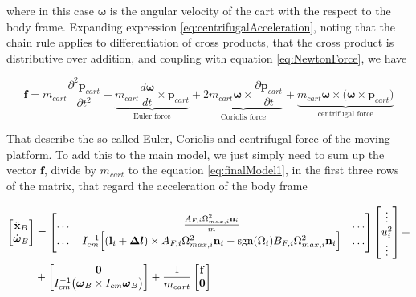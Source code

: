 \noindent where in this case $\boldsymbol{\omega}$ is the angular velocity of the cart with the respect to the body frame. Expanding expression \eqref{eq:centrifugalAcceleration}, noting that the chain rule applies to differentiation of cross products, that the cross product is distributive over addition, and coupling with equation \eqref{eq:NewtonForce}, we have

\begin{equation}
	\mathbf{f}=m_{cart}\frac{\partial^2\mathbf{p}_{cart}}{\partial t^2}+\underbrace{m_{cart}\frac{d\boldsymbol{\omega}}{dt}\times\mathbf{p}_{cart}}_{\text{Euler force}}+\underbrace{2m_{cart}\boldsymbol{\omega}\times\frac{\partial\mathbf{p}_{cart}}{\partial t}}_{\text{Coriolis force}}+\underbrace{m_{cart}\boldsymbol{\omega}\times\bigl(\boldsymbol{\omega}\times\mathbf{p}_{cart}\bigl)}_{\text{centrifugal force}}
	\label{eq:cartAllForces}
\end{equation}

\noindent That describe the so called Euler, Coriolis and centrifugal force of the moving platform. To add this to the main model, we just simply need to sum up the vector $\mathbf{f}$, divide by $m_{cart}$ to the equation \eqref{eq:finalModel1}, in the first three rows of the matrix, that regard the acceleration of the body frame

\begin{equation}
	\begin{split}
		\begin{bmatrix}
			\ddot{\mathbf{x}}_B \\
			\dot{\boldsymbol{\omega}}_B
		\end{bmatrix}
		&=
		\begin{bmatrix}
			\dots & \frac{A_{F,i}\Omega_{max,i}^2\mathbf{n}_i}{m} & \dots \\
			\dots & I_{cm}^{-1}\Big[ (\mathbf{l}_i+\boldsymbol{\Delta l})\times A_{F,i}\Omega^2_{max,i}\mathbf{n}_i-\operatorname*{sgn}(\Omega_i)B_{F,i}\Omega_{max,i}^2\mathbf{n}_i\Big] & \dots
		\end{bmatrix}
		\begin{bmatrix}
			\vdots \\
			u_i^2 \\
			\vdots
		\end{bmatrix}
		+ \\
		&+
		\begin{bmatrix}
			\mathbf{0} \\
			I_{cm}^{-1}\bigl(\boldsymbol{\omega}_B \times I_{cm} \boldsymbol{\omega}_B \bigl)
		\end{bmatrix} 
		+
		\frac{1}{m_{cart}}
		\begin{bmatrix}
		\mathbf{f} \\
		\mathbf{0}
		\end{bmatrix}
	\end{split}
	\label{eq:finalModelCart}
\end{equation}


